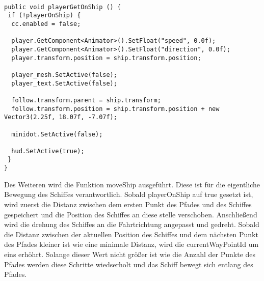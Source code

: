 \begin{scriptsize}
\lstset{
	float,
	caption=Methode playerGetOnShip, 
	language=[Sharp]C, 
	frame=single,  
	showstringspaces=false, 
	showspaces=false, 
	numbers=left, 
	captionpos=b, 
	belowcaptionskip=4pt,
	basicstyle=\ttfamily
} 
\begin{lstlisting}[label=lst:methode1]

public void playerGetOnShip () {
 if (!playerOnShip) {
  cc.enabled = false;

  player.GetComponent<Animator>().SetFloat("speed", 0.0f);
  player.GetComponent<Animator>().SetFloat("direction", 0.0f);
  player.transform.position = ship.transform.position;

  player_mesh.SetActive(false);
  player_text.SetActive(false);

  follow.transform.parent = ship.transform;
  follow.transform.position = ship.transform.position + new Vector3(2.25f, 18.07f, -7.07f);

  minidot.SetActive(false);

  hud.SetActive(true);
 }
}

\end{lstlisting}
\end{scriptsize}

Des Weiteren wird die Funktion moveShip ausgeführt. Diese ist für die eigentliche Bewegung des Schiffes verantwortlich. Sobald playerOnShip auf true gesetzt ist, wird zuerst die Distanz zwischen dem ersten Punkt des Pfades und des Schiffes gespeichert und die Position des Schiffes an diese stelle verschoben. Anschließend wird die drehung des Schiffes an die Fahrtrichtung angepasst und gedreht. Sobald die Distanz zwischen der aktuellen Position des Schiffes und dem nächsten Punkt des Pfades kleiner ist wie eine minimale Distanz, wird die currentWayPointId um eins erhöhrt. Solange dieser Wert nicht größer ist wie die Anzahl der Punkte des Pfades werden diese Schritte wiedserholt und das Schiff bewegt sich entlang des Pfades.

